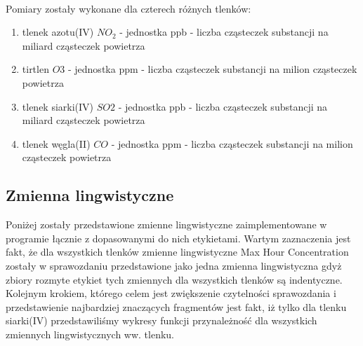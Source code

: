 \documentclass{classrep}
\begin{document}
{{            \ \\
            Pomiary zostały wykonane dla czterech różnych tlenków:
            \begin{enumerate}
                \item tlenek azotu(IV) $NO_2$  - jednostka ppb - liczba cząsteczek substancji na miliard cząsteczek powietrza
                \item tirtlen $O3$ - jednostka ppm - liczba cząsteczek substancji na milion cząsteczek powietrza
                \item tlenek siarki(IV) $SO2$ - jednostka ppb - liczba cząsteczek substancji na miliard cząsteczek powietrza
                \item tlenek węgla(II) $CO$ - jednostka ppm - liczba cząsteczek substancji na milion cząsteczek powietrza
            \end{enumerate}
        }

        \subsection{Zmienna lingwistyczne} {

            Poniżej zostały przedstawione zmienne lingwistyczne zaimplementowane w programie łącznie z dopasowanymi do nich
            etykietami. Wartym zaznaczenia jest fakt, że dla wszystkich tlenków zmienne lingwistyczne Max Hour Concentration
            zostały w sprawozdaniu przedstawione jako jedna zmienna lingwistyczna gdyż zbiory rozmyte etykiet tych zmiennych
            dla wszystkich tlenków są indentyczne. Kolejnym krokiem, którego celem jest zwiększenie czytelności sprawozdania
            i przedstawienie najbardziej znaczących fragmentów jest fakt, iż tylko dla tlenku siarki(IV) przedstawiliśmy
            wykresy funkcji przynależność dla wszystkich zmiennych lingwistycznych ww. tlenku.\\

}}
\end{document}
